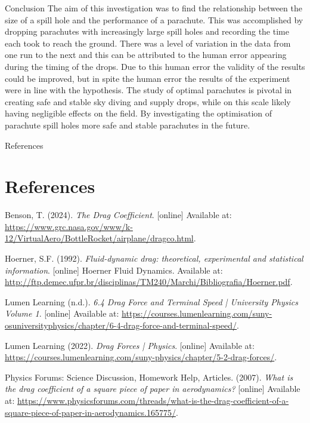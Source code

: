 \documentclass[final]{beamer}
\newlength{\colwidth}
\begin{document}
\begin{frame}[t]
\begin{columns}[t]
\begin{column}{\colwidth}
  \begin{block}{Conclusion}
The aim of this investigation was to find the relationship between the size of a spill hole and the performance of a parachute. This was accomplished by dropping parachutes with increasingly large spill holes and recording the time each took to reach the ground. There was a level of variation in the data from one run to the next and this can be attributed to the human error appearing during the timing of the drops. Due to this human error the validity of the results could be improved, but in spite the human error the results of the experiment were in line with the hypothesis. The study of optimal parachutes is pivotal in creating safe and stable sky diving and supply drops, while on this scale likely having negligible effects on the field. By investigating the optimisation of parachute spill holes more safe and stable parachutes in the future.
  \end{block}

  \begin{block}{References}

\section*{References}

\begin{thebibliography}{9}

Benson, T. (2024). \emph{The Drag Coefficient}. [online] Available at: \url{https://www.grc.nasa.gov/www/k-12/VirtualAero/BottleRocket/airplane/dragco.html}.

Hoerner, S.F. (1992). \emph{Fluid-dynamic drag: theoretical, experimental and statistical information}. [online] Hoerner Fluid Dynamics. Available at: \url{http://ftp.demec.ufpr.br/disciplinas/TM240/Marchi/Bibliografia/Hoerner.pdf}.

Lumen Learning (n.d.). \emph{6.4 Drag Force and Terminal Speed | University Physics Volume 1}. [online] Available at: \url{https://courses.lumenlearning.com/suny-osuniversityphysics/chapter/6-4-drag-force-and-terminal-speed/}.

Lumen Learning (2022). \emph{Drag Forces | Physics}. [online] Available at: \url{https://courses.lumenlearning.com/suny-physics/chapter/5-2-drag-forces/}.

Physics Forums: Science Discussion, Homework Help, Articles. (2007). \emph{What is the drag coefficient of a square piece of paper in aerodynamics?} [online] Available at: \url{https://www.physicsforums.com/threads/what-is-the-drag-coefficient-of-a-square-piece-of-paper-in-aerodynamics.165775/}.


\end{thebibliography}
\end{block}
\end{column}
\end{columns}
\end{frame}
\end{document}
